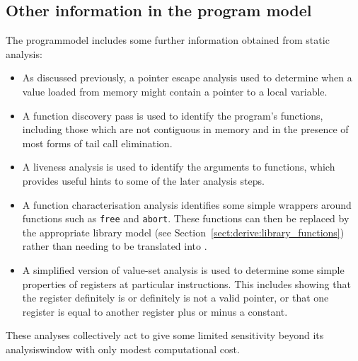 \subsection{Other information in the program model}

The \gls{programmodel} includes some further information obtained from
static analysis:
\begin{itemize}
\item As discussed previously, a pointer escape analysis used to
  determine when a value loaded from memory might contain a pointer to
  a local variable.
\item A function discovery pass is used to identify the program's
  functions, including those which are not contiguous in
  memory and in the presence of most forms of tail call
  elimination\needCite{}.
\item A liveness analysis is used to identify the arguments to
  functions, which provides useful hints to some of the later analysis
  steps.
\item A function characterisation analysis identifies some simple
  wrappers around functions such as \texttt{free} and \texttt{abort}.
  These functions can then be replaced by the appropriate library
  model (see Section~\ref{sect:derive:library_functions}) rather than
  needing to be translated into {\StateMachines}.
\item A simplified version of value-set
  analysis\cite{Balakrishnan2004} is used to determine some simple
  properties of registers at particular instructions.  This includes
  showing that the register definitely is or definitely is not a valid
  pointer, or that one register is equal to another register plus or
  minus a constant.
\end{itemize}
These analyses collectively act to give {\technique} some limited
sensitivity beyond its \gls{analysiswindow} with only modest
computational cost.
